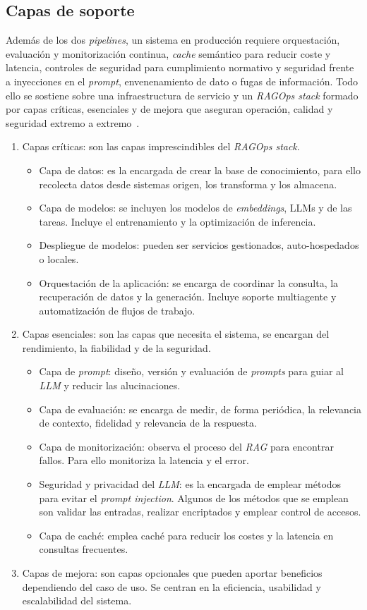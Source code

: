 \subsection{Capas de soporte}
Además de los dos \textit{pipelines}, un sistema en producción requiere orquestación, evaluación y monitorización continua, \textit{cache} semántico para reducir coste y latencia, controles de seguridad para cumplimiento normativo y seguridad frente a inyecciones en el \textit{prompt}, envenenamiento de dato o fugas de información. Todo ello se sostiene sobre una infraestructura de servicio y un \textit{RAGOps stack} formado por capas críticas, esenciales y de mejora que aseguran operación, calidad y seguridad extremo a extremo~\cite{book:RAG_SimpleGuide}.
\begin{enumerate}
\tightlist
	\item Capas críticas: son las capas imprescindibles del \textit{RAGOps stack}.
	\begin{itemize}
	\tightlist
		\item Capa de datos: es la encargada de crear la base de conocimiento, para ello recolecta datos desde sistemas origen, los transforma y los almacena.
		\item Capa de modelos: se incluyen los modelos de \textit{embeddings}, LLMs y de las tareas. Incluye el entrenamiento y la optimización de inferencia.
		\item Despliegue de modelos: pueden ser servicios gestionados, auto-hospedados o locales.
		\item Orquestación de la aplicación: se encarga de coordinar la consulta, la recuperación de datos y la generación. Incluye soporte multiagente y automatización de flujos de trabajo. 
	\end{itemize}
	\item Capas esenciales: son las capas que necesita el sistema, se encargan del rendimiento, la fiabilidad y de la seguridad.
	\begin{itemize}
	\tightlist
		\item Capa de \textit{prompt}: diseño, versión y evaluación de \textit{prompts} para guiar al \textit{LLM} y reducir las alucinaciones. 
		\item Capa de evaluación: se encarga de medir, de forma periódica, la relevancia de contexto, fidelidad y relevancia de la respuesta.
		\item Capa de monitorización: observa el proceso del \textit{RAG} para encontrar fallos. Para ello monitoriza la latencia y el error.
		\item Seguridad y privacidad del \textit{LLM}: es la encargada de emplear métodos para evitar el \textit{prompt injection}. Algunos de los métodos que se emplean son validar las entradas, realizar encriptados y emplear control de accesos.
		\item Capa de caché: emplea caché para reducir los costes y la latencia en consultas frecuentes.
	\end{itemize}
	\item Capas de mejora: son capas opcionales que pueden aportar beneficios dependiendo del caso de uso. Se centran en la eficiencia, usabilidad y escalabilidad del sistema.
\end{enumerate}

